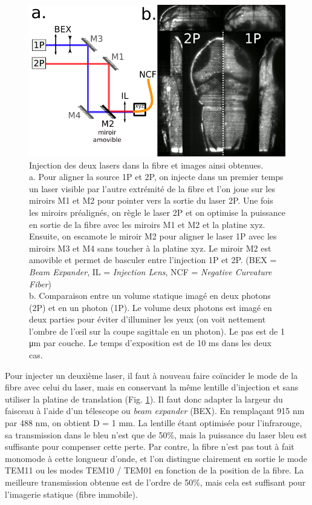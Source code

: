 \begin{figure}
    \centering
    \includegraphics[width=\textwidth]{./files/injection+graystack_1P2P.svg.png}
    \caption{Injection des deux lasers dans la fibre et images ainsi obtenues.
    \\a. Pour aligner la source 1P et 2P, on injecte dans un premier temps un laser visible par l'autre extrémité de la fibre et l'on joue sur les miroirs M1 et M2 pour pointer vers la sortie du laser 2P. Une fois les miroirs préalignés, on règle le laser 2P et on optimise la puissance en sortie de la fibre avec les miroirs M1 et M2 et la platine xyz. Ensuite, on escamote le miroir M2 pour aligner le laser 1P avec les miroirs M3 et M4 sans toucher à la platine xyz. Le miroir M2 est amovible et permet de basculer entre l'injection 1P et 2P. (BEX = \emph{Beam Expander}, IL = \emph{Injection Lens}, NCF = \emph{Negative Curvature Fiber})
    \\ b. Comparaison entre un volume statique imagé en deux photons (2P) et en un photon (1P). Le volume deux photons est imagé en deux parties pour éviter d’illuminer les yeux (on voit nettement l’ombre de l'œil sur la coupe sagittale en un photon). Le pas est de 1 μm par couche. Le temps d'exposition est de 10 ms dans les deux cas.
    \label{FIGinjectiongraystack}}
    \end{figure}

Pour injecter un deuxième laser, il faut à nouveau faire coïncider le mode de la fibre avec celui du laser, mais en conservant la même lentille d'injection et sans utiliser la platine de translation (Fig. \ref{FIGinjectiongraystack}). Il faut donc adapter la largeur du faisceau à l'aide d'un télescope ou \emph{beam expander} (BEX). En remplaçant 915 nm par 488 nm, on obtient D = 1 mm. La lentille étant optimisée pour l'infrarouge, sa transmission dans le bleu n'est que de 50\%, mais la puissance du laser bleu est suffisante pour compenser cette perte. Par contre, la fibre n'est pas tout à fait monomode à cette longueur d'onde, et l'on distingue clairement en sortie le mode TEM11 ou les modes TEM10 / TEM01 en fonction de la position de la fibre. La meilleure transmission obtenue est de l'ordre de 50\%, mais cela est suffisant pour l'imagerie statique (fibre immobile).

